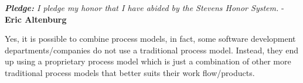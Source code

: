 \newcommand\NAME{Eric Altenburg}  %
\newcommand\COURSE{CS 347}
\newcommand\HWNUM{1}              %


\begin{center}
	\textit{\textbf{Pledge:} I pledge my honor that I have abided by the Stevens Honor System.} - \textbf{\NAME}
\end{center}




	Yes, it is possible to combine process models, in fact, some software development departments/companies do not use a traditional process model. Instead, they end up using a proprietary process model which is just a combination of other more traditional process models that better suits their work flow/products.\par

